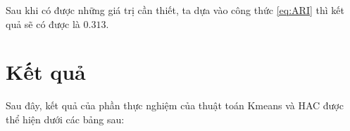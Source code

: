 Sau khi có được những giá trị cần thiết, ta dựa vào công thức \ref{eq:ARI} thì kết quả sẽ có được là $0.313$.

%
%		
%		
%
%
%

\section{Kết quả}
Sau đây, kết quả của phần thực nghiệm của thuật toán Kmeans và HAC được thể hiện dưới các bảng sau:

